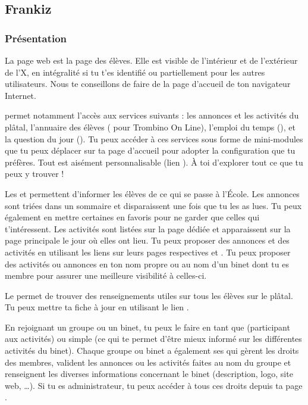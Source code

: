 \subsection{Frankiz}


\subsubsection{Présentation}

\label{frankiz} La page web \fkz est la page des \'el\`eves. Elle est visible de l'int\'erieur et de
l'ext\'erieur de l'X, en int\'egralit\'e si tu t'es identifi\'e ou partiellement pour les autres
utilisateurs. Nous te conseillons de faire de  la page d'accueil de ton navigateur Internet.

\fkz permet notamment l'acc\`es aux services suivants : les
annonces et les activit\'es du pl\^atal, l'annuaire des \'el\`eves
( pour Trombino On Line), l'emploi du temps (), et la question du jour (). Tu peux accéder à ces services sous forme de mini-modules que tu peux d\'eplacer sur ta page d'accueil pour adopter la configuration que tu préfères.
Tout est ais\'ement personnalisable (lien ). \`A toi d'explorer tout ce que tu peux y trouver !

Les  et  permettent d'informer les \'el\`eves de ce qui se passe \`a  l'\'Ecole. Les annonces sont tri\'ees dans
un sommaire et disparaissent une fois que tu les as lues. Tu peux \'egalement en mettre certaines en favoris pour ne garder que celles qui t'int\'eressent. Les activit\'es sont list\'ees sur la page d\'edi\'ee et apparaissent
sur la page principale le jour o\`u elles ont lieu. Tu peux proposer des annonces et des activit\'es en utilisant les liens sur leurs pages respectives  et . Tu peux proposer des activit\'es ou annonces en ton nom propre ou au nom d'un binet dont tu es membre pour assurer une meilleure visibilit\'e \`a celles-ci.

Le  permet de trouver des renseignements utiles sur
tous les \'el\`eves sur le pl\^atal. Tu peux mettre ta fiche \`a  jour en
utilisant le lien .

En rejoignant un groupe ou un binet, tu peux le faire en tant que  (participant aux activit\'es) ou simple  (ce qui te permet d'être mieux informé sur les différentes activités du binet). Chaque groupe ou binet a \'egalement ses  qui g\`erent les droits des membres, valident les annonces ou les activit\'es faites au nom du groupe et renseignent les diverses informations concernant le binet (description, logo, site web, \dots). Si tu es administrateur, tu peux acc\'eder \`a tous ces droits depuis ta page .

